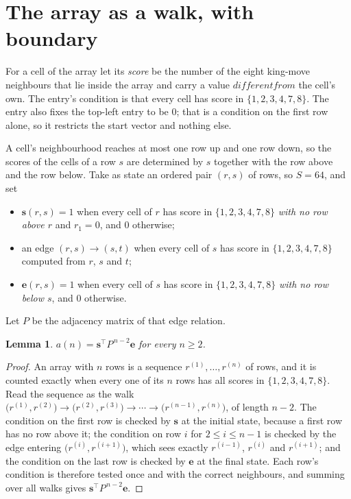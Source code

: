 \documentclass[11pt,a4paper]{article}
\theoremstyle{plain}
\newtheorem{lemma}[theorem]{Lemma}
\theoremstyle{definition}
\begin{document}
\section{The array as a walk, with boundary}

For a cell of the array let its \emph{score} be the number of the eight king-move neighbours that lie inside
the array and carry a value $different from$ the cell's own. The entry's condition is that every cell
has score in $\{1,2,3,4,7,8\}$. The entry also fixes the top-left entry to be $0$; that is a condition on the first row alone, so it restricts the start vector and nothing else.

A cell's neighbourhood reaches at most one row up and one row down, so the scores of the
cells of a row $s$ are determined by $s$ together with the row above and the row below.
Take as state an ordered pair $(r,s)$ of rows, so $S=64$, and set
\begin{itemize}
\item $\mathbf{s}(r,s)=1$ when every cell of $r$ has score in $\{1,2,3,4,7,8\}$ \emph{with no row
above $r$} and $r_1=0$, and $0$ otherwise;
\item an edge $(r,s)\to(s,t)$ when every cell of $s$ has score in $\{1,2,3,4,7,8\}$ computed from
$r$, $s$ and $t$;
\item $\mathbf{e}(r,s)=1$ when every cell of $s$ has score in $\{1,2,3,4,7,8\}$ \emph{with no row
below $s$}, and $0$ otherwise.
\end{itemize}
Let $P$ be the adjacency matrix of that edge relation.

\begin{lemma}\label{lem:walk}
$a(n)=\mathbf{s}^{\!\top}P^{\,n-2}\mathbf{e}$ for every $n\ge2$.
\end{lemma}

\begin{proof}
An array with $n$ rows is a sequence $r^{(1)},\dots,r^{(n)}$ of rows, and it is counted
exactly when every one of its $n$ rows has all scores in $\{1,2,3,4,7,8\}$. Read the sequence as the
walk $\bigl(r^{(1)},r^{(2)}\bigr)\to\bigl(r^{(2)},r^{(3)}\bigr)\to\cdots\to
\bigl(r^{(n-1)},r^{(n)}\bigr)$, of length $n-2$. The condition on the first row is
checked by $\mathbf{s}$ at the initial state, because a first row has no row above it; the
condition on row $i$ for $2\le i\le n-1$ is checked by the edge entering
$\bigl(r^{(i)},r^{(i+1)}\bigr)$, which sees exactly $r^{(i-1)}$, $r^{(i)}$ and
$r^{(i+1)}$; and the condition on the last row is checked by $\mathbf{e}$ at the final
state. Each row's condition is therefore tested once and with the correct neighbours, and
summing over all walks gives $\mathbf{s}^{\!\top}P^{\,n-2}\mathbf{e}$.
\end{proof}
\end{document}
